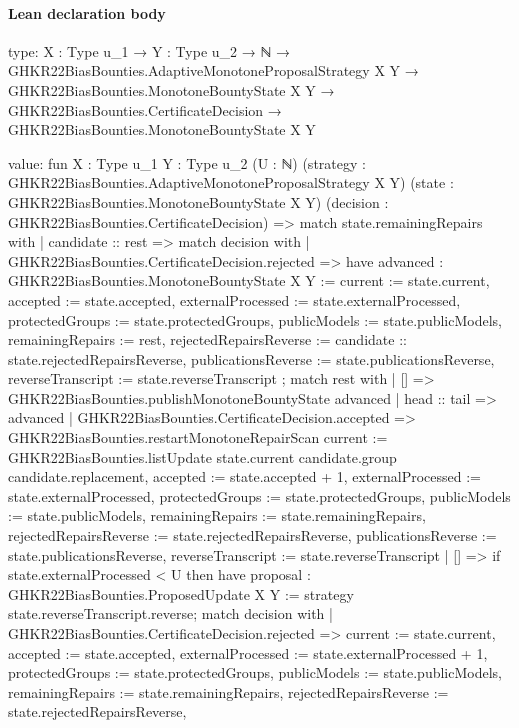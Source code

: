 \documentclass[10pt]{article}
\begin{document}
\paragraph{Lean declaration body}
\begin{ReviewVerbatim}
type:
{X : Type u_1} →
  {Y : Type u_2} →
    ℕ →
      GHKR22BiasBounties.AdaptiveMonotoneProposalStrategy X Y →
        GHKR22BiasBounties.MonotoneBountyState X Y →
          GHKR22BiasBounties.CertificateDecision → GHKR22BiasBounties.MonotoneBountyState X Y

value:
fun {X : Type u_1} {Y : Type u_2} (U : ℕ) (strategy : GHKR22BiasBounties.AdaptiveMonotoneProposalStrategy X Y)
    (state : GHKR22BiasBounties.MonotoneBountyState X Y) (decision : GHKR22BiasBounties.CertificateDecision) =>
  match state.remainingRepairs with
  | candidate :: rest =>
    match decision with
    | GHKR22BiasBounties.CertificateDecision.rejected =>
      have advanced : GHKR22BiasBounties.MonotoneBountyState X Y :=
        { current := state.current, accepted := state.accepted, externalProcessed := state.externalProcessed,
          protectedGroups := state.protectedGroups, publicModels := state.publicModels, remainingRepairs := rest,
          rejectedRepairsReverse := candidate :: state.rejectedRepairsReverse,
          publicationsReverse := state.publicationsReverse, reverseTranscript := state.reverseTranscript };
      match rest with
      | [] => GHKR22BiasBounties.publishMonotoneBountyState advanced
      | head :: tail => advanced
    | GHKR22BiasBounties.CertificateDecision.accepted =>
      GHKR22BiasBounties.restartMonotoneRepairScan
        { current := GHKR22BiasBounties.listUpdate state.current candidate.group candidate.replacement,
          accepted := state.accepted + 1, externalProcessed := state.externalProcessed,
          protectedGroups := state.protectedGroups, publicModels := state.publicModels,
          remainingRepairs := state.remainingRepairs, rejectedRepairsReverse := state.rejectedRepairsReverse,
          publicationsReverse := state.publicationsReverse, reverseTranscript := state.reverseTranscript }
  | [] =>
    if state.externalProcessed < U then
      have proposal : GHKR22BiasBounties.ProposedUpdate X Y := strategy state.reverseTranscript.reverse;
      match decision with
      | GHKR22BiasBounties.CertificateDecision.rejected =>
        { current := state.current, accepted := state.accepted, externalProcessed := state.externalProcessed + 1,
          protectedGroups := state.protectedGroups, publicModels := state.publicModels,
          remainingRepairs := state.remainingRepairs, rejectedRepairsReverse := state.rejectedRepairsReverse,
}
\end{ReviewVerbatim}
\end{document}
